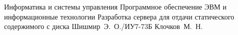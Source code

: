 \documentclass{bmstu}
\begin{document}
\makecourseworktitle
	{Информатика и системы управления}
	{Программное обеспечение ЭВМ и информационные технологии}
	{Разработка сервера для отдачи статического содержимого с диска}
	{Шишмир~Э.~О./ИУ7-73Б}
	{Клочков~М.~Н.} 
	{}{}{}

\setcounter{page}{3}

\setlength{\cftbeforetoctitleskip}{-22pt}
\renewcommand{\cftaftertoctitle}{\hfill}
\renewcommand{\contentsname}{\hfill\LARGE СОДЕРЖАНИЕ\hfill}
\tableofcontents




% 



\makebibliography
\end{document}
